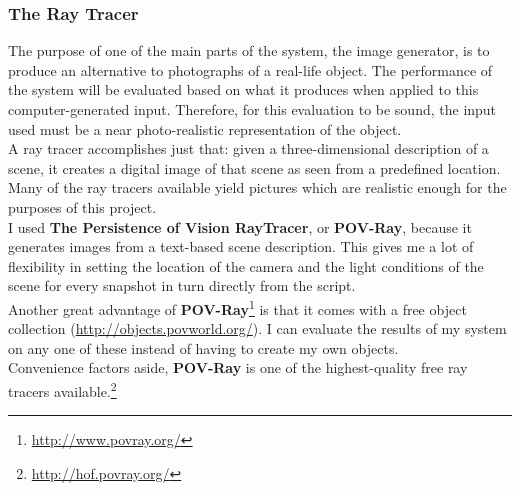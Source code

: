 \documentclass[12pt,a4paper,twoside,openright]{report}
\begin{document}
\subsubsection{The Ray Tracer} 
The purpose of one of the main parts of the system, the image generator, is to produce an alternative to photographs of a real-life object. The performance of the system will be evaluated based on what it produces when applied to this computer-generated input. Therefore, for this evaluation to be sound, the input used must be a near photo-realistic representation of the object.\\  
\linebreak
A ray tracer accomplishes just that: given a three-dimensional description of a scene, it creates a digital image of that scene as seen from a predefined location. Many of the ray tracers available yield pictures which are realistic enough for the purposes of this project. \\   
I used \textbf{The Persistence of Vision RayTracer}, or \textbf{POV-Ray}, because it generates images from a text-based scene description. This gives me a lot of flexibility in setting the location of the camera and the light conditions of the scene for every snapshot in turn directly from the script.\\
Another great advantage of \textbf{POV-Ray}\footnote{\url{http://www.povray.org/}} is that it comes with a free object collection (\url{http://objects.povworld.org/}). I can evaluate the results of my system on any one of these instead of having to create my own objects.\\
Convenience factors aside, \textbf{POV-Ray} is one of the highest-quality free ray tracers available.\footnote{\url{http://hof.povray.org/}}
\end{document}
